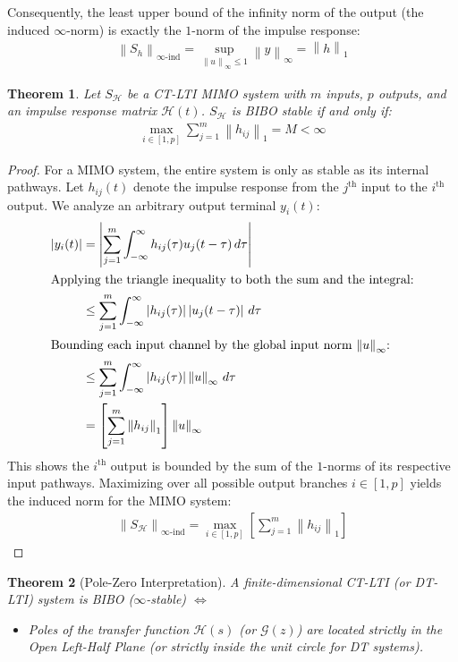 \documentclass[11pt, a4paper, twoside]{article}
\newcommand{\norm}[1]{\left\lVert#1\right\rVert}
\newcommand{\abs}[1]{\left\lvert#1\right\rvert}
\newcounter{lecnum}
\theoremstyle{plain}
\newtheorem{theorem}{Theorem}[lecnum]
\theoremstyle{definition}
\begin{document}
Consequently, the least upper bound of the infinity norm of the output (the induced $\infty$-norm) is exactly the $1$-norm of the impulse response:
%
\begin{align*}
	\norm{S_h}_{\infty\text{-ind}} = \sup_{\norm{u}_{\infty} \leq 1} \norm{y}_{\infty} = \norm{h}_{1} 
\end{align*}

\begin{theorem}
Let $S_{\mathcal{H}}$ be a CT-LTI MIMO system with $m$ inputs, $p$ outputs, and an impulse response matrix $\mathcal{H}(t)$. $S_{\mathcal{H}}$ is BIBO stable if and only if:
%
\begin{align*}
	\max_{i \in [1,p]} \sum_{j=1}^m \norm{h_{ij}}_1 = M < \infty
\end{align*}
\end{theorem}

\begin{proof}
For a MIMO system, the entire system is only as stable as its internal pathways. Let $h_{ij}(t)$ denote the impulse response from the $j^{\text{th}}$ input to the $i^{\text{th}}$ output. We analyze an arbitrary output terminal $y_i(t)$:
%
\begin{align*}
	\abs{y_i(t)} &= \abs{\sum_{j=1}^m \int_{-\infty}^{\infty} h_{ij}(\tau) u_j(t - \tau) \, d\tau } \\
    \intertext{Applying the triangle inequality to both the sum and the integral:}
	&\leq \sum_{j=1}^m \int_{-\infty}^{\infty} \abs{h_{ij}(\tau)} \abs{u_j(t - \tau)} \, d\tau \\
    \intertext{Bounding each input channel by the global input norm $\norm{u}_{\infty}$:}
    &\leq \sum_{j=1}^m \int_{-\infty}^{\infty} \abs{h_{ij}(\tau)} \norm{u}_{\infty} \, d\tau \\
	&= \left[ \sum_{j=1}^m \norm{h_{ij}}_1 \right] \norm{u}_{\infty} 
\end{align*}
% 
This shows the $i^{\text{th}}$ output is bounded by the sum of the $1$-norms of its respective input pathways. Maximizing over all possible output branches $i \in [1,p]$ yields the induced norm for the MIMO system:
\begin{align*}
	\norm{S_\mathcal{H}}_{\infty\text{-ind}} = \max_{i \in [1,p]} \left[ \sum_{j=1}^m \norm{h_{ij}}_1 \right]
\end{align*}
\end{proof}

\begin{theorem}[Pole-Zero Interpretation]
A finite-dimensional CT-LTI (or DT-LTI) system is BIBO ($\infty$-stable) $\iff$
\begin{itemize}[label=\textbullet]
\item Poles of the transfer function $\mathcal{H}(s)$ (or $\mathcal{G}(z)$) are located strictly in the Open Left-Half Plane (or strictly inside the unit circle for DT systems).
\end{itemize}
\end{theorem}
\end{document}
